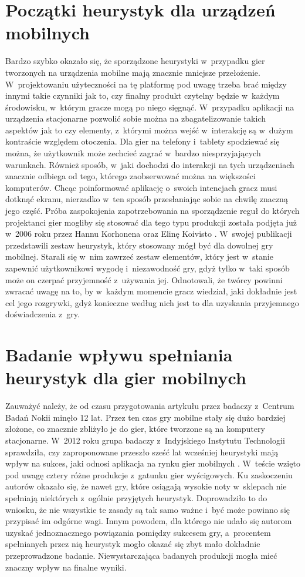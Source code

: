 \documentclass[a4paper,12pt,numbers=noenddot]{report}
\begin{document}
\section{Początki heurystyk dla urządzeń mobilnych}
Bardzo szybko okazało się, że sporządzone heurystyki w~przypadku gier tworzonych na urządzenia mobilne mają znacznie mniejsze przełożenie. W~projektowaniu użyteczności na tę platformę pod uwagę trzeba brać między innymi takie czynniki jak to, czy finalny produkt czytelny będzie w~każdym środowisku, w~którym gracze mogą po niego sięgnąć. W~przypadku aplikacji na urządzenia stacjonarne pozwolić sobie można na zbagatelizowanie takich aspektów jak to czy elementy, z~którymi można wejść w~interakcję są w~dużym kontraście względem otoczenia. Dla gier na telefony i~tablety spodziewać się można, że użytkownik może zechcieć zagrać w~bardzo niesprzyjających warunkach. Również sposób, w~jaki dochodzi do interakcji na tych urządzeniach znacznie odbiega od tego, którego zaobserwować można na większości komputerów. Chcąc poinformować aplikację o~swoich intencjach gracz musi dotknąć ekranu, nierzadko w~ten sposób przesłaniając sobie na chwilę znaczną jego część. 
Próba zaspokojenia zapotrzebowania na sporządzenie reguł do których projektanci gier mogliby się stosować dla tego typu produkcji została podjęta już w~2006 roku przez Hannu Korhonena oraz Elinę Koivisto \cite{art_playabilityHeuristics}. W~swojej publikacji przedstawili zestaw heurystyk, który stosowany mógł być dla dowolnej gry mobilnej. Starali się w~nim zawrzeć zestaw elementów, który jest w~stanie zapewnić użytkownikowi wygodę i~niezawodność gry, gdyż tylko w~taki sposób może on czerpać przyjemność z~używania jej. Odnotowali, że twórcy powinni zwracać uwagę na to, by w~każdym momencie gracz wiedział, jaki dokładnie jest cel jego rozgrywki, gdyż konieczne według nich jest to dla uzyskania przyjemnego doświadczenia z~gry.

\section{Badanie wpływu spełniania heurystyk dla gier mobilnych}
Zauważyć należy, że od czasu przygotowania artykułu przez badaczy z~Centrum Badań Nokii minęło 12 lat. Przez ten czas gry mobilne stały się dużo bardziej złożone, co znacznie zbliżyło je do gier, które tworzone są na komputery stacjonarne. W~2012 roku grupa badaczy z~Indyjskiego Instytutu Technologii sprawdziła, czy zaproponowane przeszło sześć lat wcześniej heurystyki mają wpływ na sukces, jaki odnosi aplikacja na rynku gier mobilnych  \cite{art_evaluationOfMG}. W~teście wzięto pod uwagę cztery różne produkcje z~gatunku gier wyścigowych. Ku zaskoczeniu autorów okazało się, że nawet gry, które osiągają wysokie noty w~sklepach nie spełniają niektórych z~ogólnie przyjętych heurystyk. Doprowadziło to do wniosku, że nie wszystkie te zasady są tak samo ważne i~być może powinno się przypisać im odgórne wagi. Innym powodem, dla którego nie udało się autorom uzyskać jednoznacznego powiązania pomiędzy sukcesem gry, a~procentem spełnianych przez nią heurystyk mogło okazać się zbyt mało dokładnie przeprowadzone badanie. Niewystarczająca badanych produkcji mogła mieć znaczny wpływ na finalne wyniki.
\end{document}

